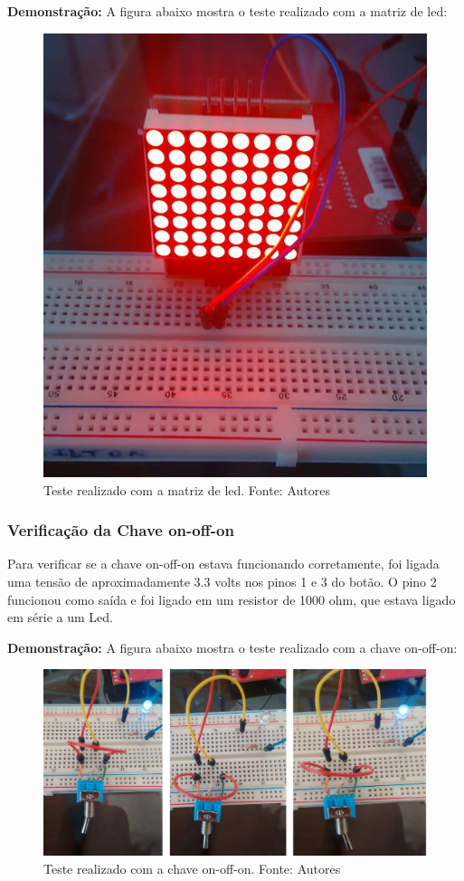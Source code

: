 \documentclass[conference]{IEEEtran}
\begin{document}
\textbf{Demonstração:}
A figura abaixo mostra o teste realizado com a matriz de led:
\begin{figure}[H]
  \centering
  \includegraphics[width=0.5\linewidth]{dem_matriz}
  \caption{Teste realizado com a matriz de led. Fonte: Autores}
  \label{fig:dem_matriz}
\end{figure}

\subsubsection{Verificação da Chave on-off-on}
Para verificar se a chave on-off-on estava funcionando corretamente, foi ligada uma tensão de aproximadamente 3.3 volts nos pinos 1 e 3 do botão. O pino 2 funcionou como saída e foi ligado em um resistor de 1000 ohm, que estava ligado em série a um Led.

%
%
\textbf{Demonstração:}
A figura abaixo mostra o teste realizado com a chave on-off-on:
\begin{figure}[H]
  \centering
  \includegraphics[width=0.5\linewidth]{on-off}
  \caption{Teste realizado com a chave on-off-on. Fonte: Autores}
  \label{fig:dem_on_off}
\end{figure}
\end{document}
